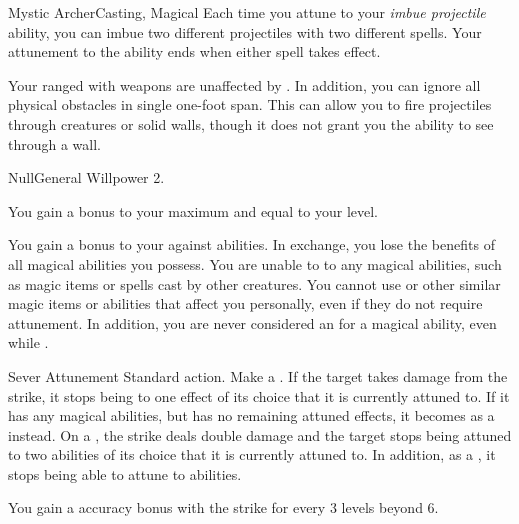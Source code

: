 \begin{magicalfeat}{Mystic Archer}{Casting, Magical}
     Each time you attune to your \textit{imbue projectile} ability, you can imbue two different projectiles with two different spells.
    Your attunement to the ability ends when either spell takes effect.

     Your ranged  with  weapons are unaffected by .
    In addition, you can ignore all physical obstacles in single one-foot span.
    This can allow you to fire projectiles through creatures or solid walls, though it does not grant you the ability to see through a wall.
  \end{magicalfeat}

  \begin{feat}{Null}{General}
    \featpre Willpower 2.

     You gain a bonus to your maximum  and  equal to your level.

     You gain a  bonus to your  against \magical abilities.
    In exchange, you lose the benefits of all magical abilities you possess.
    You are unable to  to any magical abilities, such as magic items or spells cast by other creatures.
    You cannot use  or other similar magic items or abilities that affect you personally, even if they do not require attunement.
    In addition, you are never considered an  for a magical ability, even while \unconscious.

    \begin{activeability}{Sever Attunement}
      \abilityusagetime Standard action.
      \rankline
      Make a .
      If the target takes damage from the strike, it stops being  to one effect of its choice that it is currently attuned to.
      If it has any magical abilities, but has no remaining attuned effects, it becomes \stunned as a  instead.
      On a , the strike deals double damage and the target stops being attuned to two abilities of its choice that it is currently attuned to.
      In addition, as a , it stops being able to attune to abilities.

      \rankline
      You gain a  accuracy bonus with the strike for every 3 levels beyond 6.
    \end{activeability}


\end{feat}
